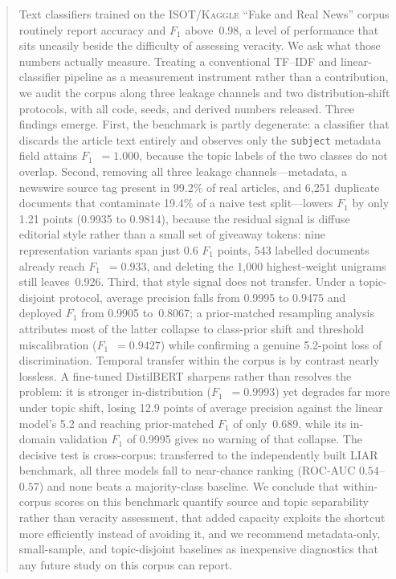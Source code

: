 \documentclass[conference]{IEEEtran}
\newcommand{\dataset}{\textsc{ISOT/Kaggle}}
\newcommand{\Fone}{$F_1$}
\begin{document}
\begin{abstract}
Text classifiers trained on the \dataset{} ``Fake and Real News'' corpus
routinely report accuracy and \Fone{} above~0.98, a level of performance that
sits uneasily beside the difficulty of assessing veracity. We ask what those
numbers actually measure. Treating a conventional TF--IDF and linear-classifier
pipeline as a measurement instrument rather than a contribution, we audit the
corpus along three leakage channels and two distribution-shift protocols, with
all code, seeds, and derived numbers released. Three findings emerge. First,
the benchmark is partly degenerate: a classifier that discards the article text
entirely and observes only the \texttt{subject} metadata field attains
\Fone{}~$=1.000$, because the topic labels of the two classes do not overlap.
Second, removing all three leakage channels---metadata, a newswire source tag
present in 99.2\% of real articles, and 6{,}251 duplicate documents that
contaminate 19.4\% of a naive test split---lowers \Fone{} by only 1.21 points
(0.9935 to 0.9814), because the residual signal is diffuse editorial style
rather than a small set of giveaway tokens: nine representation variants span
just 0.6 \Fone{} points, 543 labelled documents already reach \Fone{}~$=0.933$,
and deleting the 1{,}000 highest-weight unigrams still leaves~0.926. Third, that
style signal does not transfer. Under a topic-disjoint protocol, average
precision falls from 0.9995 to 0.9475 and deployed \Fone{} from 0.9905
to~0.8067; a prior-matched resampling analysis attributes most of the latter
collapse to class-prior shift and threshold miscalibration
(\Fone{}~$=0.9427$) while confirming a genuine 5.2-point loss of
discrimination. Temporal transfer within the corpus is by contrast nearly
lossless. A fine-tuned DistilBERT sharpens rather than resolves the problem: it
is stronger in-distribution (\Fone{}~$=0.9993$) yet degrades far more under
topic shift, losing 12.9 points of average precision against the linear model's
5.2 and reaching prior-matched \Fone{} of only~0.689, while its in-domain
validation \Fone{} of 0.9995 gives no warning of that collapse. The decisive
test is cross-corpus: transferred to the independently built LIAR benchmark, all
three models fall to near-chance ranking (ROC-AUC $0.54$--$0.57$) and none beats
a majority-class baseline. We conclude that within-corpus scores on this
benchmark quantify source and topic separability rather than veracity
assessment, that added capacity exploits the shortcut more efficiently instead
of avoiding it, and we recommend metadata-only,
small-sample, and topic-disjoint baselines as inexpensive diagnostics that any
future study on this corpus can report.
\end{abstract}
\end{document}
